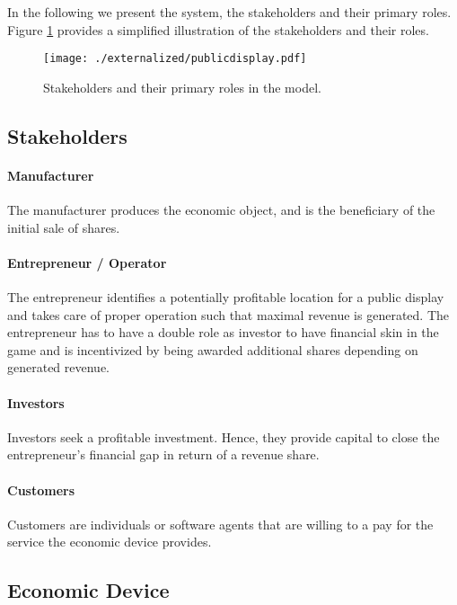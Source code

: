 In the following we present the system, the stakeholders and their primary roles. Figure \ref{fig:smartproperty} provides a simplified illustration of the stakeholders and their roles. 

\begin{figure}[!t]
    \centering
    \texttt{[image: ./externalized/publicdisplay.pdf]}
    \caption{Stakeholders and their primary roles in the model.}
    \label{fig:smartproperty}
  \end{figure}

\subsection{Stakeholders}

\paragraph{Manufacturer}

The manufacturer produces the economic object, and is the beneficiary of the initial sale of shares.

\paragraph{Entrepreneur / Operator}

The entrepreneur identifies a potentially profitable location for a public display and takes care of proper operation such that maximal revenue is generated. The entrepreneur has to have a double role as investor to have financial skin in the game and is incentivized by being awarded additional shares depending on generated revenue.

\paragraph{Investors}

Investors seek a profitable investment. Hence, they provide capital to close the entrepreneur's financial gap in return of a revenue share.

\paragraph{Customers}

Customers are individuals or software agents that are willing to a pay for the service the economic device provides.

\subsection{Economic Device}

